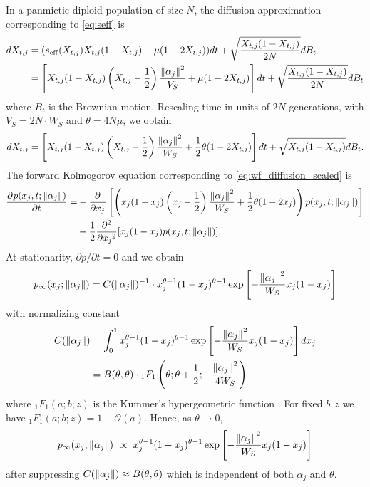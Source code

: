 \documentclass[10pt]{article}
\begin{document}
In a panmictic diploid population of size $N$,
the diffusion approximation corresponding to \eqref{eq:seff} is
\begin{align} \label{eq:wf_diffusion_raw}
    \begin{aligned}
    dX_{t,j} &= (\seff(X_{t,j})X_{t,j}(1-X_{t,j}) + \mu(1-2X_{t,j}))dt + \sqrt{\frac{X_{t,j}(1-X_{t,j})}{2N}}dB_t \\
    &= \left[ X_{t,j}(1-X_{t,j})\left(X_{t,j}-\frac{1}{2}\right)\frac{\norm{\alpha_j}^2}{V_S}
    + \mu(1-2X_{t,j}) 
    \right] 
    dt + \sqrt{\frac{X_{t,j}(1-X_{t,j})}{2N}}dB_t
    \end{aligned}
\end{align}
where $B_t$ is the Brownian motion. 
Rescaling time in units of $2N$ generations, with $V_S = 2N \cdot W_S$ and $\theta = 4N\mu$, we obtain
\begin{align} \label{eq:wf_diffusion_scaled}
    dX_{t,j} = \left[
    X_{t,j}(1-X_{t,j})\left(X_{t,j}-\frac{1}{2}\right)\frac{\norm{\alpha_j}^2}{W_S} 
    + \frac{1}{2}\theta(1-2X_{t,j})
    \right] 
    dt + \sqrt{X_{t,j}(1-X_{t,j})}dB_t.
\end{align}
The forward Kolmogorov equation corresponding to \eqref{eq:wf_diffusion_scaled} is
\begin{align} \label{eq:fwd_kolmogorov_scaled}
    \begin{aligned}
     \pard{p(x_j,t;\norm{\alpha_j})}{t} 
     =& -\pard{}{x_j} 
     \left[
     \left(
        x_j(1-x_j)\left(x_j-\frac{1}{2}\right)
        \frac{\norm{\alpha_j}^2}{W_S}
        + \frac{1}{2}\theta(1-2x_j)
        \right)
        p(x_j,t;\norm{\alpha_j})
     \right] \\
     &+\frac{1}{2} \pard[2]{}{x_j}[x_j(1-x_j)p(x_j,t;\norm{\alpha_j})].
     \end{aligned}
\end{align}
At stationarity, $\partial p/\partial t=0$ and we obtain \citep{Ewens2004mathpopgen}
\begin{align} \label{eq:stat_dist}
     p_{\infty}(x_j;\norm{\alpha_j}) = C(\norm{\alpha_j})^{-1} \cdot
     x_j^{\theta-1}(1-x_j)^{\theta-1} 
     \exp\left[-\frac{\norm{\alpha_j}^2}{W_S}x_j(1-x_j) \right]
\end{align}
with normalizing constant 
\begin{align*} \label{eq:norm_const}
    C(\norm{\alpha_j}) &= \int_0^1 x_j^{\theta-1}(1-x_j)^{\theta-1} 
    \exp\left[-\frac{\norm{\alpha_j}^2}{W_S}x_j(1-x_j) \right] dx_j \\
    &= B(\theta, \theta) 
    \cdot {_1F_1} \left(
    \theta; \theta + \frac{1}{2}; -\frac{\norm{\alpha_j}^2}{4W_S}
    \right)
\end{align*}
where $_1F_1(a;b;z)$ is the Kummer's hypergeometric function
\citep{us2010nisthandbookofmathematical}.
For fixed $b,z$ we have $_1F_1(a;b;z) = 1 + \mathcal{O}(a)$. Hence, as $\theta \to 0$,
\begin{align}
    p_{\infty}(x_j ; \norm{\alpha_j}) \ \propto \
    x_j^{\theta-1}(1-x_j)^{\theta-1}
    \exp\left[-\frac{\norm{\alpha_j}^2}{W_S}x_j(1-x_j) \right]
\end{align}
after suppressing $C(\norm{\alpha_j}) \approx B(\theta, \theta)$ which is independent of both $\alpha_j$ and $\theta$.
\end{document}
